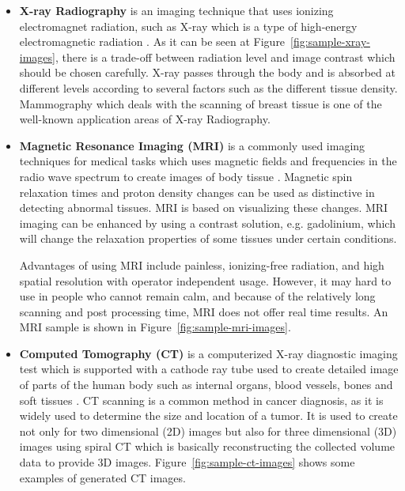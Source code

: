         \begin{itemize}

            \item \textbf{X-ray Radiography} is an imaging technique that uses ionizing electromagnet radiation, such as X-ray which is a type of high-energy electromagnetic radiation \cite{kasban2015comparative}.
                    As it can be seen at Figure~\ref{fig:sample-xray-images}, there is a trade-off between radiation level and image contrast which should be chosen carefully.
                    X-ray passes through the body and is absorbed at different levels according to several factors such as the different tissue density.
                    Mammography which deals with the scanning of breast tissue is one of the well-known application areas of X-ray Radiography.

                    

            \item \textbf{Magnetic Resonance Imaging (MRI)} is a commonly used imaging techniques for medical tasks
                    which uses magnetic fields and frequencies in the radio wave spectrum to create images of body tissue \cite{mehmood2013prioritization}.
                    Magnetic spin relaxation times and proton density changes can be used as distinctive in detecting abnormal tissues.
                    MRI is based on visualizing these changes.
                    MRI imaging can be enhanced by using a contrast solution, e.g. gadolinium, which will change the relaxation properties of some tissues under certain conditions.

                    

                    Advantages of using MRI include painless, ionizing-free radiation, and high spatial resolution with operator independent usage.
                    However, it may hard to use in people who cannot remain calm, and because of the relatively long scanning and post processing time, MRI does not offer real time results.
                    An MRI sample is shown in Figure~\ref{fig:sample-mri-images}.

            \item \textbf{Computed Tomography (CT)} is a computerized X-ray diagnostic imaging test which is supported with a cathode ray tube used to create detailed image of parts of the human body such as internal organs, blood vessels, bones and soft tissues \cite{Computed66online}.
                    CT scanning is a common method in cancer diagnosis, as it is widely used to determine the size and location of a tumor.
                    It is used to create not only for two dimensional (2D) images but also for three dimensional (3D) images using spiral CT which is basically reconstructing the collected volume data to provide 3D images.
                    Figure~\ref{fig:sample-ct-images} shows some examples of generated CT images.


\end{itemize}
